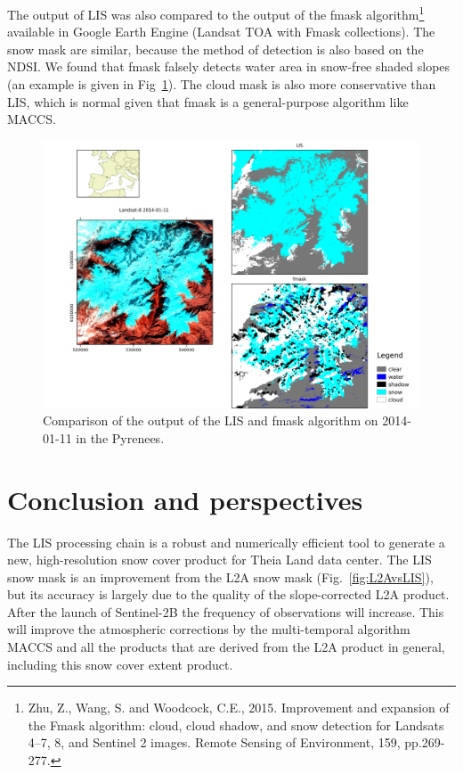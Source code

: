 \documentclass[a4paper]{article}
\begin{document}
The output of LIS was also compared to the output of the fmask algorithm\footnote{Zhu, Z., Wang, S. and Woodcock, C.E., 2015. Improvement and expansion of the Fmask algorithm: cloud, cloud shadow, and snow detection for Landsats 4–7, 8, and Sentinel 2 images. Remote Sensing of Environment, 159, pp.269-277.} available in Google Earth Engine (Landsat TOA with Fmask collections). The snow mask are similar, because the method of detection is also based on the NDSI. We found that fmask falsely detects water area in snow-free shaded slopes (an example is given in Fig~\ref{fig:fmask}). The cloud mask is also more conservative than LIS, which is normal given that fmask is a general-purpose algorithm like MACCS. 

\begin{figure}[h]
 \centering
 \includegraphics[width=\textwidth]{./images/fmask20140111.png}
 \caption{Comparison of the output of the LIS and fmask algorithm on 2014-01-11 in the Pyrenees.}
 \label{fig:fmask}
\end{figure}


\clearpage

\section{Conclusion and perspectives}\label{par:conclu}

The LIS processing chain is a robust and numerically efficient tool to generate a new, high-resolution snow cover product for Theia Land data center. The LIS snow mask is an improvement from the L2A snow mask (Fig.~\ref{fig:L2AvsLIS}), but its accuracy is largely due to the quality of the slope-corrected L2A product. After the launch of Sentinel-2B the frequency of observations will increase. This will improve the atmospheric corrections by the multi-temporal algorithm MACCS and all the products that are derived from the L2A product in general, including this snow cover extent product. 
\end{document}
